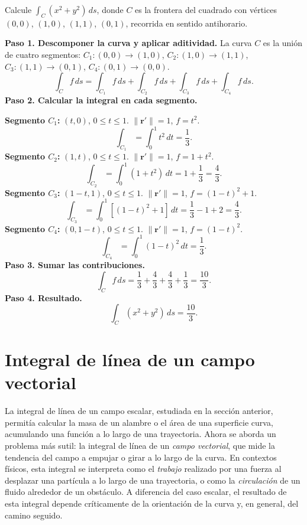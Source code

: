 \begin{example}
Calcule \(\displaystyle \int_C (x^2 + y^2)\,ds\), donde \(C\) es la
frontera del cuadrado con vértices \((0,0)\), \((1,0)\), \((1,1)\),
\((0,1)\), recorrida en sentido antihorario.
\begin{myproof}
\textbf{Paso 1. Descomponer la curva y aplicar aditividad.} La curva $C$ es la unión de cuatro segmentos:
$C_1: (0,0)\to(1,0)$, $C_2: (1,0)\to(1,1)$, $C_3: (1,1)\to(0,1)$, $C_4: (0,1)\to(0,0)$.
\[
\int_C f\,ds = \int_{C_1} f\,ds + \int_{C_2} f\,ds + \int_{C_3} f\,ds + \int_{C_4} f\,ds.
\]
\textbf{Paso 2. Calcular la integral en cada segmento.}

\textbf{Segmento $C_1$:} $(t,0)$, $0\le t\le 1$. $\|\mathbf{r}'\|=1$, $f=t^2$.
\[
\int_{C_1} = \int_0^1 t^2\,dt = \frac{1}{3}.
\]
\textbf{Segmento $C_2$:} $(1,t)$, $0\le t\le 1$. $\|\mathbf{r}'\|=1$, $f=1+t^2$.
\[
\int_{C_2} = \int_0^1 (1+t^2)\,dt = 1 + \frac{1}{3} = \frac{4}{3}.
\]
\textbf{Segmento $C_3$:} $(1-t,1)$, $0\le t\le 1$. $\|\mathbf{r}'\|=1$, $f=(1-t)^2+1$.
\[
\int_{C_3} = \int_0^1 [(1-t)^2+1]\,dt = \frac{1}{3} - 1 + 2 = \frac{4}{3}.
\]
\textbf{Segmento $C_4$:} $(0,1-t)$, $0\le t\le 1$. $\|\mathbf{r}'\|=1$, $f=(1-t)^2$.
\[
\int_{C_4} = \int_0^1 (1-t)^2\,dt = \frac{1}{3}.
\]
\textbf{Paso 3. Sumar las contribuciones.}
\[
\int_C f\,ds = \frac{1}{3} + \frac{4}{3} + \frac{4}{3} + \frac{1}{3} = \frac{10}{3}.
\]
\textbf{Paso 4. Resultado.}
\[
\boxed{\int_C (x^2+y^2)\,ds = \frac{10}{3}.}
\]
\end{myproof}
\end{example}

\section{Integral de línea de un campo vectorial}


La integral de línea de un campo escalar, estudiada en la sección anterior, permitía calcular la masa de un alambre o el área de una superficie curva,
acumulando una función a lo largo de una trayectoria. Ahora se aborda un
problema más sutil: la integral de línea de un \emph{campo vectorial}, que
mide la tendencia del campo a empujar o girar a lo largo de la curva. En
contextos físicos, esta integral se interpreta como el \emph{trabajo}
realizado por una fuerza al desplazar una partícula a lo largo de una
trayectoria, o como la \emph{circulación} de un fluido alrededor de un
obstáculo. A diferencia del caso escalar, el resultado de esta integral
depende críticamente de la orientación de la curva y, en general, del
camino seguido.

